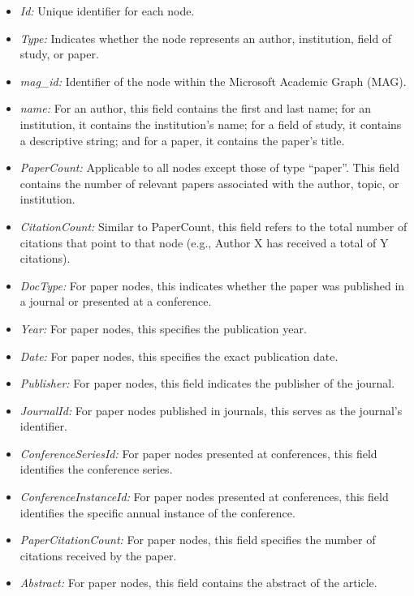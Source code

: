 \begin{itemize}
    \item \emph{Id:} Unique identifier for each node.
    \item \emph{Type:} Indicates whether the node represents an author, institution, field of study, or paper.
    \item \emph{mag\_id:} Identifier of the node within the Microsoft Academic Graph (MAG).
    \item \emph{name:} For an author, this field contains the first and last name; for an institution, it contains the institution's name; for a field of study, it contains a descriptive string; and for a paper, it contains the paper's title.
    \item \emph{PaperCount:} Applicable to all nodes except those of type ``paper''. This field contains the number of relevant papers associated with the author, topic, or institution.
    \item \emph{CitationCount:} Similar to PaperCount, this field refers to the total number of citations that point to that node (e.g., Author X has received a total of Y citations).
    \item \emph{DocType:} For paper nodes, this indicates whether the paper was published in a journal or presented at a conference.
    \item \emph{Year:} For paper nodes, this specifies the publication year.
    \item \emph{Date:} For paper nodes, this specifies the exact publication date.
    \item \emph{Publisher:} For paper nodes, this field indicates the publisher of the journal.
    \item \emph{JournalId:} For paper nodes published in journals, this serves as the journal's identifier.
    \item \emph{ConferenceSeriesId:} For paper nodes presented at conferences, this field identifies the conference series.
    \item \emph{ConferenceInstanceId:} For paper nodes presented at conferences, this field identifies the specific annual instance of the conference.
    \item \emph{PaperCitationCount:} For paper nodes, this field specifies the number of citations received by the paper.
    \item \emph{Abstract:} For paper nodes, this field contains the abstract of the article.
\end{itemize}

